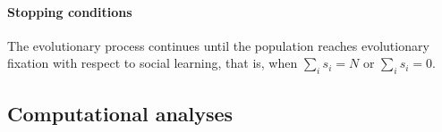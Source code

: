 \documentclass[letterpaper,11.5pt]{scrartcl}
\newcommand{\cm}[1]{{\textcolor{mypurple} {({\tiny CM:} #1)}}}
\begin{document}
\paragraph{Stopping conditions} The evolutionary process continues until the
population reaches evolutionary fixation with respect to social learning, that is, when
$\sum_i s_i = N$ or $\sum_i s_i = 0$. 

\clearpage



\subsection{Computational analyses}
\label{ssec:computationalAnalyses}

\end{document}
